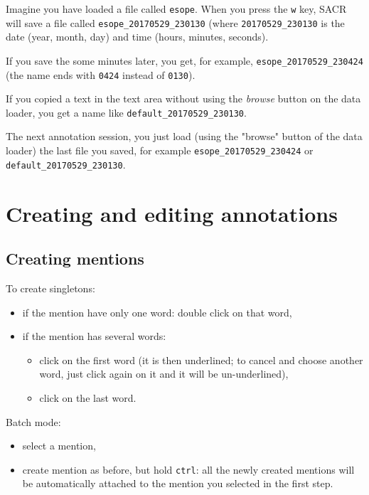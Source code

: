\documentclass[12pt]{article}
\begin{document}
Imagine you have loaded a file called \verb|esope|.  When you press the
\verb|w| key, SACR will save a file called \verb|esope_20170529_230130|
(where \verb|20170529_230130| is the date (year, month, day) and time (hours,
minutes, seconds).

If you save the some minutes later, you get, for example,
\verb|esope_20170529_230424| (the name ends with \verb|0424| instead of
\verb|0130|).

If you copied a text in the text area without using the \emph{browse} button
on the data loader, you get a name like \verb|default_20170529_230130|.

The next annotation session, you just load (using the "browse" button of the
data loader) the last file you saved, for example
\verb|esope_20170529_230424| or \verb|default_20170529_230130|.

 \section{Creating and editing annotations}

 \subsection{Creating mentions}

\label{sec:creating-mentions}

To create singletons:
\begin{itemize}
   \item if the mention have only one word: double click on that word,
   \item if the mention has several words:
     \begin{itemize}
         \item click on the first word (it is then underlined; to cancel and
         choose another word, just click again on it and it will be
         un-underlined),
         \item click on the last word.
      \end{itemize}
\end{itemize}

Batch mode:
\begin{itemize}
   \item select a mention,
   \item create mention as before, but hold \verb|ctrl|: all the newly
   created mentions will be automatically attached to the mention you
   selected in the first step.
\end{itemize}
\end{document}
